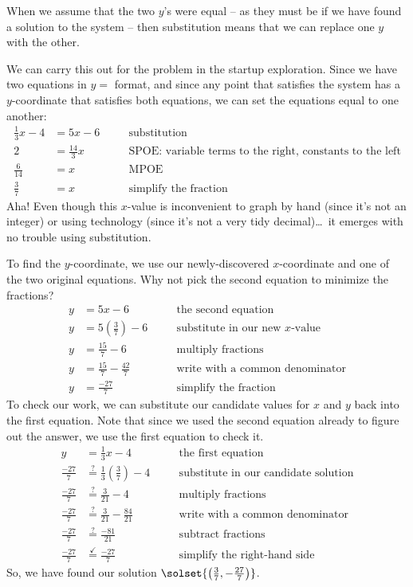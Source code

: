 When we assume that the two $y$'s were equal -- as they must be if we have found a solution to the system -- then substitution means that we can replace one $y$ with the other.

We can carry this out for the problem in the startup exploration. Since we have two equations in $y=$ format, and since any point that satisfies the system has a $y$-coordinate that satisfies both equations, we can set the equations equal to one another:
\[\begin{aligned}
\frac{1}{3}x - 4 &= 5x - 6
&& \quad\text{substitution}\\[1ex]
2 &= \frac{14}{3}x
&& \quad\text{SPOE: variable terms to the right, constants to the left}\\[1ex]
\frac{6}{14} &= x
&& \quad\text{MPOE}\\[1ex]
\frac{3}{7} &= x
&& \quad\text{simplify the fraction}
\end{aligned}\]
Aha! Even though this $x$-value is inconvenient to graph by hand (since it's not an integer) or using technology (since it's not a very tidy decimal)\ldots\ it emerges with no trouble using substitution.

To find the $y$-coordinate, we use our newly-discovered $x$-coordinate and one of the two original equations. Why not pick the second equation to minimize the fractions?
\[\begin{aligned}
y &= 5x - 6
&& \quad\text{the second equation}\\[1ex]
y &= 5\left(\frac{3}{7}\right)-6
&& \quad\text{substitute in our new $x$-value}\\[1ex]
y &= \frac{15}{7} - 6
&& \quad\text{multiply fractions}\\[1ex]
y &= \frac{15}{7}-\frac{42}{7}
&& \quad\text{write with a common denominator}\\[1ex]
y &= \frac{-27}{7}
&& \quad\text{simplify the fraction}
\end{aligned}\]
To check our work, we can substitute our candidate values for $x$ and $y$ back into the first equation. Note that since we used the second equation already to figure out the answer, we use the first equation to check it.
\[\begin{aligned}
y &= \frac{1}{3}x - 4
&& \quad\text{the first equation}\\[1ex]
\frac{-27}{7} &\overset{?}{=} \frac{1}{3}\left(\frac{3}{7}\right)-4
&& \quad\text{substitute in our candidate solution}\\[1ex]
\frac{-27}{7} &\overset{?}{=} \frac{3}{21}-4
&& \quad\text{multiply fractions}\\[1ex]
\frac{-27}{7} &\overset{?}{=} \frac{3}{21}-\frac{84}{21}
&& \quad\text{write with a common denominator}\\[1ex]
\frac{-27}{7} &\overset{?}{=} \frac{-81}{21}
&& \quad\text{subtract fractions}\\[1ex]
\frac{-27}{7} &\overset{\checkmark}{=} \frac{-27}{7}
&& \quad\text{simplify the right-hand side}
\end{aligned}\]
So, we have found our solution $\solset{\left(\frac{3}{7}, -\frac{27}{7}\right)}$.

